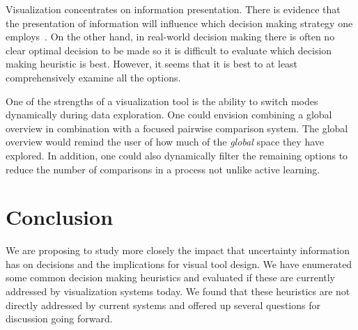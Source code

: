 Visualization concentrates on information
presentation. There is evidence that the presentation of information will
influence which decision making strategy one employs~\citep{Jarvenpaa:1990}.
On the other hand, in real-world decision making there is often no clear
optimal decision to be made so it is difficult to evaluate which decision
making heuristic is best. However, it seems that it is best to at least
comprehensively examine all the options.

One of the strengths of a visualization tool is the ability to switch modes
dynamically during data exploration. One could envision combining a
global overview in combination with a focused pairwise comparison system.
The global overview would remind the user of how much of the \emph{global}
space they have explored. In addition, one could also dynamically filter
the remaining options to reduce the number of comparisons in a process
not unlike active learning.





\section{Conclusion}

We are proposing to study more closely the impact that uncertainty information
has on decisions and the implications for visual tool design. 
We have enumerated some common decision making heuristics and evaluated
if these are currently addressed by visualization systems today. We found that
these heuristics are not directly addressed by current systems and offered up
several questions for discussion going forward.

